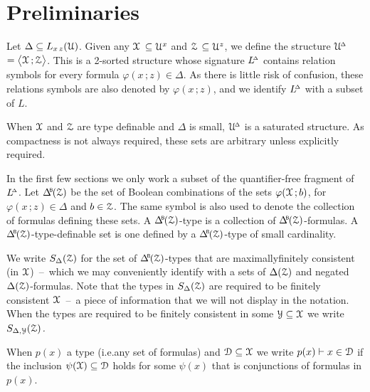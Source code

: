\section{Preliminaries}
\label{actions}

\def\ceq#1#2#3{\noindent\parbox[t]{15ex}{$\displaystyle #1$}\parbox{6ex}{\hfil $#2$}{$\displaystyle #3$}}


Let $\Delta\subseteq L_{x\,z}(\EuScript U)$.
Given any \emph{$\EuScript X$\/} $\subseteq\EuScript U^x$ and \emph{$\EuScript Z$\/} $\subseteq\EuScript U^z$, we define the structure \emph{$\EuScript U\kern-.2ex^{\scriptscriptstyle\Delta}$\/} $=\big\langle\EuScript X\,;\EuScript Z\big\rangle$.
This is a 2-sorted structure whose signature \emph{$L\kern-.4ex^{\scriptscriptstyle\Delta}$\/} contains relation symbols for every formula $\varphi(x\,;z)\in\Delta$.
As there is little risk of confusion, these relations symbols are also denoted by $\varphi(x\,;z)$, and we identify $L\kern-.4ex^{\scriptscriptstyle\Delta}$ with a subset of $L$.

When $\EuScript X$ and $\EuScript Z$ are type definable and $\Delta$ is small, $\EuScript U\kern-.2ex^{\scriptscriptstyle\Delta}$ is a saturated structure.
As compactness is not always required, these sets are arbitrary unless explicitly required.

In the first few sections we only work a subset of the quantifier-free fragment of $L\kern-.4ex^{\scriptscriptstyle\Delta}$.
Let $\BDelta(\Z)$ be the set of Boolean combinations of the sets $\varphi(\EuScript X\,;b)$, for $\varphi(x\,;z)\in\Delta$ and $b\in\EuScript Z$.
The same symbol is also used to denote the collection of formulas defining these sets.
A $\BDelta(\Z)$-type is a collection of $\BDelta(\Z)$-formulas.
A $\BDelta(\Z)$-type-definable set is one defined by a $\BDelta(\Z)$-type of small cardinality.

We write \emph{$S_\Delta(\EuScript Z)$\/} for the set of $\BDelta(\Z)$-types that are maximallyfinitely consistent (in $\EuScript X$)~--~which we may conveniently identify with a sets of $\Delta(\EuScript Z)$ and negated $\Delta(\EuScript Z)$-formulas.
Note that the types in $S_\Delta(\EuScript Z)$ are required to be finitely consistent $\EuScript X$~--~a piece of information that we will not display in the notation.
When the types are required to be finitely consistent in some $\EuScript Y\subseteq\EuScript X$ we write \emph{$S_{\Delta,\EuScript Y}(\EuScript Z)$.}


When $p(x)$ a type (i.e.\@ any set of formulas) and $\EuScript D\subseteq\EuScript X$ we write $p(x)\vdash x\in\EuScript D$ if the inclusion $\psi(\EuScript X)\subseteq\EuScript D$ holds for some $\psi(x)$ that is conjunctions of formulas in $p(x)$.

